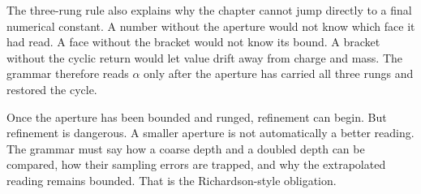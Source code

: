 The three-rung rule also explains why the chapter cannot jump directly to a
final numerical constant. A number without the aperture would not know which
face it had read. A face without the bracket would not know its bound. A
bracket without the cyclic return would let value drift away from charge and
mass. The grammar therefore reads \(\alpha\) only after the aperture has
carried all three rungs and restored the cycle.

Once the aperture has been bounded and runged, refinement can begin. But
refinement is dangerous. A smaller aperture is not automatically a better
reading. The grammar must say how a coarse depth and a doubled depth can be
compared, how their sampling errors are trapped, and why the extrapolated
reading remains bounded. That is the Richardson-style obligation.
